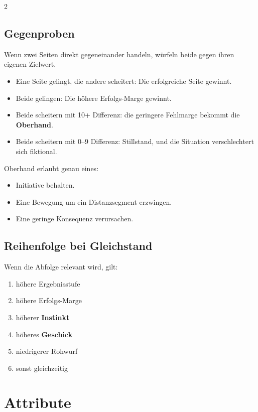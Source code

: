 \begin{multicols*}{2}
\subsection{Gegenproben}\label{sec:gegenproben}

Wenn zwei Seiten direkt gegeneinander handeln, würfeln beide gegen ihren eigenen Zielwert.

\begin{itemize}[leftmargin=*]
\item Eine Seite gelingt, die andere scheitert: Die erfolgreiche Seite gewinnt.
\item Beide gelingen: Die höhere Erfolgs-Marge gewinnt.
\item Beide scheitern mit 10+ Differenz: die geringere Fehlmarge bekommt die \textbf{Oberhand}.
\item Beide scheitern mit 0--9 Differenz: Stillstand, und die Situation verschlechtert sich fiktional.
\end{itemize}

Oberhand erlaubt genau eines:

\begin{itemize}[leftmargin=*]
\item Initiative behalten.
\item Eine Bewegung um ein Distanzsegment erzwingen.
\item Eine geringe Konsequenz verursachen.
\end{itemize}

\subsection{Reihenfolge bei Gleichstand}

Wenn die Abfolge relevant wird, gilt:

\begin{enumerate}[leftmargin=*]
\item höhere Ergebnisstufe
\item höhere Erfolgs-Marge
\item höherer \textbf{Instinkt}
\item höheres \textbf{Geschick}
\item niedrigerer Rohwurf
\item sonst gleichzeitig
\end{enumerate}

\section{Attribute}\label{sec:attribute}


\end{multicols*}
